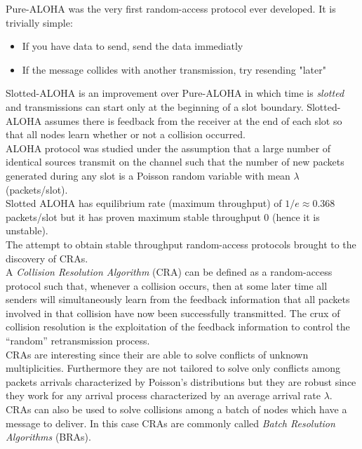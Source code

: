 \documentclass[12pt,a4paper]{report}
\begin{document}
Pure-ALOHA was the very first random-access protocol ever developed. It is trivially simple:
\begin{itemize}
\item If you have data to send, send the data immediatly
\item If the message collides with another transmission, try resending "later"
\end{itemize}
Slotted-ALOHA is an improvement over Pure-ALOHA in which time is \emph{slotted} and transmissions can start only at the beginning of a slot boundary. Slotted-ALOHA assumes there is feedback from the receiver at the end of each slot so that all nodes learn whether or not a collision occurred.\\
ALOHA protocol was studied under the assumption that a large number of identical sources transmit on the channel such that the number of new packets generated during any slot is a Poisson random variable with mean $\lambda$ (packets/slot).\\
Slotted ALOHA has equilibrium rate (maximum throughput) of $1/e\approx 0.368$ packets/slot but it has proven maximum stable throughput 0 (hence it is unstable).\\
The attempt to obtain stable throughput random-access protocols brought to the discovery of CRAs.\\

A \emph{Collision Resolution Algorithm} (CRA) can be defined as a random-access protocol such that, whenever a collision occurs, then at some later time all senders will simultaneously learn from the feedback information that all packets involved in that collision have now been  successfully transmitted. The crux of collision resolution is the exploitation of the feedback information to control the ``random'' retransmission process.\\%

CRAs are interesting since their are able to solve conflicts of unknown multiplicities. Furthermore they are not tailored to solve only conflicts among packets arrivals characterized by Poisson's distributions but they are robust since they work for any arrival process characterized by an average arrival rate $\lambda$.\\

CRAs can also be used to solve collisions among a batch of nodes which have a message to deliver. In this case CRAs are commonly called \emph{Batch Resolution Algorithms} (BRAs).\\
\end{document}
